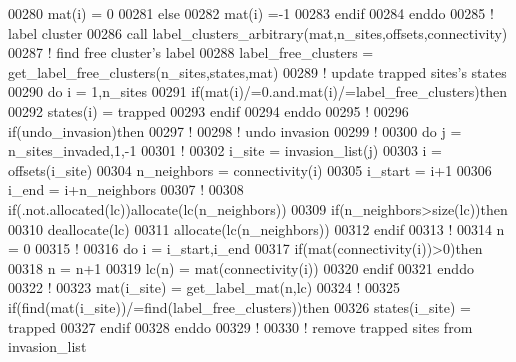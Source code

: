 \begin{DoxyCode}
00280           mat(i) = 0
00281        \textcolor{keyword}{else}
00282           mat(i) =-1
00283        \textcolor{keyword}{endif}
00284     \textcolor{keyword}{enddo}
00285     \textcolor{comment}{! label cluster}
00286     call label\_clusters\_arbitrary(mat,n\_sites,offsets,connectivity)
00287     \textcolor{comment}{! find free cluster's label}
00288     label\_free\_clusters = get\_label\_free\_clusters(n\_sites,states,mat)
00289     \textcolor{comment}{! update trapped sites's states}
00290     \textcolor{keyword}{do} i = 1,n\_sites
00291        \textcolor{keyword}{if}(mat(i)/=0.and.mat(i)/=label\_free\_clusters)\textcolor{keyword}{then}
00292           states(i) = trapped
00293        \textcolor{keyword}{endif}
00294     \textcolor{keyword}{enddo}
00295     \textcolor{comment}{!}
00296     \textcolor{keyword}{if}(undo\_invasion)\textcolor{keyword}{then}
00297        \textcolor{comment}{!}
00298        \textcolor{comment}{! undo invasion}
00299        \textcolor{comment}{!}
00300        \textcolor{keyword}{do} j = n\_sites\_invaded,1,-1
00301           \textcolor{comment}{!}
00302           i\_site = invasion\_list(j) 
00303           i = offsets(i\_site)
00304           n\_neighbors = connectivity(i)
00305           i\_start = i+1
00306           i\_end  = i+n\_neighbors
00307           \textcolor{comment}{!}
00308           \textcolor{keyword}{if}(.not.\textcolor{keyword}{allocated}(lc))\textcolor{keyword}{allocate}(lc(n\_neighbors))
00309           \textcolor{keyword}{if}(n\_neighbors>\textcolor{keyword}{size}(lc))\textcolor{keyword}{then}
00310              \textcolor{keyword}{deallocate}(lc)
00311              \textcolor{keyword}{allocate}(lc(n\_neighbors))
00312           \textcolor{keyword}{endif}
00313           \textcolor{comment}{!}
00314           n = 0
00315           \textcolor{comment}{!}
00316           \textcolor{keyword}{do} i = i\_start,i\_end 
00317              \textcolor{keyword}{if}(mat(connectivity(i))>0)\textcolor{keyword}{then}
00318                 n = n+1
00319                 lc(n) = mat(connectivity(i))
00320              \textcolor{keyword}{endif}
00321           \textcolor{keyword}{enddo}
00322           \textcolor{comment}{!}
00323           mat(i\_site) = get\_label\_mat(n,lc)
00324           \textcolor{comment}{!}
00325           \textcolor{keyword}{if}(find(mat(i\_site))/=find(label\_free\_clusters))\textcolor{keyword}{then}
00326              states(i\_site) = trapped
00327           \textcolor{keyword}{endif}
00328        \textcolor{keyword}{enddo}
00329        \textcolor{comment}{!}
00330        \textcolor{comment}{! remove trapped sites from invasion\_list}

\end{DoxyCode}
